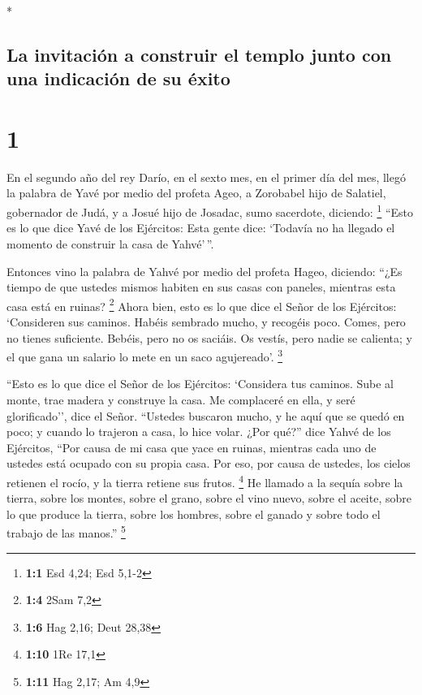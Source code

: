 \begin{paracol}{2} \switchcolumn[0]*

\hypertarget{la-invitaciuxf3n-a-construir-el-templo-junto-con-una-indicaciuxf3n-de-su-uxe9xito}{%
\subsection{La invitación a construir el templo junto con una indicación
de su
éxito}\label{la-invitaciuxf3n-a-construir-el-templo-junto-con-una-indicaciuxf3n-de-su-uxe9xito}}

\hypertarget{section}{%
\section{1}\label{section}}

 En el segundo año del rey Darío, en el sexto mes, en el
primer día del mes, llegó la palabra de Yavé por medio del profeta Ageo,
a Zorobabel hijo de Salatiel, gobernador de Judá, y a Josué hijo de
Josadac, sumo sacerdote, diciendo: \footnote{\textbf{1:1} Esd 4,24; Esd
  5,1-2}  ``Esto es lo que dice Yavé de los Ejércitos:
Esta gente dice: `Todavía no ha llegado el momento de construir la casa
de Yahvé'\,''.

 Entonces vino la palabra de Yahvé por medio del profeta
Hageo, diciendo:  ``¿Es tiempo de que ustedes mismos
habiten en sus casas con paneles, mientras esta casa está en ruinas?
\footnote{\textbf{1:4} 2Sam 7,2}  Ahora bien, esto es lo
que dice el Señor de los Ejércitos: `Consideren sus caminos.
 Habéis sembrado mucho, y recogéis poco. Comes, pero no
tienes suficiente. Bebéis, pero no os saciáis. Os vestís, pero nadie se
calienta; y el que gana un salario lo mete en un saco agujereado'.
\footnote{\textbf{1:6} Hag 2,16; Deut 28,38}

 ``Esto es lo que dice el Señor de los Ejércitos:
`Considera tus caminos.  Sube al monte, trae madera y
construye la casa. Me complaceré en ella, y seré glorificado'', dice el
Señor.  ``Ustedes buscaron mucho, y he aquí que se quedó
en poco; y cuando lo trajeron a casa, lo hice volar. ¿Por qué?'' dice
Yahvé de los Ejércitos, ``Por causa de mi casa que yace en ruinas,
mientras cada uno de ustedes está ocupado con su propia casa.
 Por eso, por causa de ustedes, los cielos retienen el
rocío, y la tierra retiene sus frutos. \footnote{\textbf{1:10} 1Re 17,1}
 He llamado a la sequía sobre la tierra, sobre los
montes, sobre el grano, sobre el vino nuevo, sobre el aceite, sobre lo
que produce la tierra, sobre los hombres, sobre el ganado y sobre todo
el trabajo de las manos.'' \footnote{\textbf{1:11} Hag 2,17; Am 4,9}


\end{paracol}
